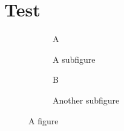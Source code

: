 \documentclass[a4paper,12pt,fleqn,openany]{memoir}
\begin{document}
\listoffigures

\chapter{Test}

\begin{figure}    
    \begin{subfigure}[b]{.5\linewidth}
        \centering\large A
        \caption{A subfigure}\label{fig:1a}
    \end{subfigure}%
    \begin{subfigure}[b]{.5\linewidth}
        \centering\large B
        \caption{Another subfigure}\label{fig:1b}
    \end{subfigure}
    \caption{A figure}\label{fig:1}
\end{figure}
\end{document}
